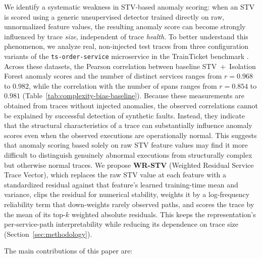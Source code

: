 We identify a systematic weakness in STV-based anomaly scoring: when an STV
is scored using a generic unsupervised detector trained directly on raw,
unnormalized feature values, the resulting anomaly score can become
strongly influenced by trace \emph{size}, independent of trace
\emph{health}. To better understand this phenomenon, we analyze real, non-injected
test traces from three configuration variants of the
\texttt{ts-order-service} microservice in the TrainTicket benchmark \cite{zhou2021trainticket}.
Across these datasets, the Pearson correlation between baseline
STV~+~Isolation Forest anomaly scores and the number of distinct
services ranges from $r = 0.968$ to $0.982$, while the correlation with
the number of spans ranges from $r = 0.854$ to $0.981$
(Table~\ref{tab:complexity-bias-baseline}). Because these measurements are obtained from traces without injected
anomalies, the observed correlations cannot be explained by successful
detection of synthetic faults. Instead, they indicate that the structural characteristics of a trace can
substantially influence anomaly scores even when the observed executions
are operationally normal. This suggests that anomaly scoring based solely on raw STV feature
values may find it more difficult to distinguish genuinely abnormal
executions from structurally complex but otherwise normal traces.
We propose \textbf{WR-STV} (Weighted Residual Service Trace Vector), which
replaces the raw STV value at each feature with a standardized residual
against that feature's learned training-time mean and variance, clips the
residual for numerical stability, weights it by a log-frequency reliability
term that down-weights rarely observed paths, and scores the trace by the
mean of its top-$k$ weighted absolute residuals. This keeps the
representation's per-service-path interpretability while reducing its dependence on trace size (Section~\ref{sec:methodology}).

The main contributions of this paper are:

